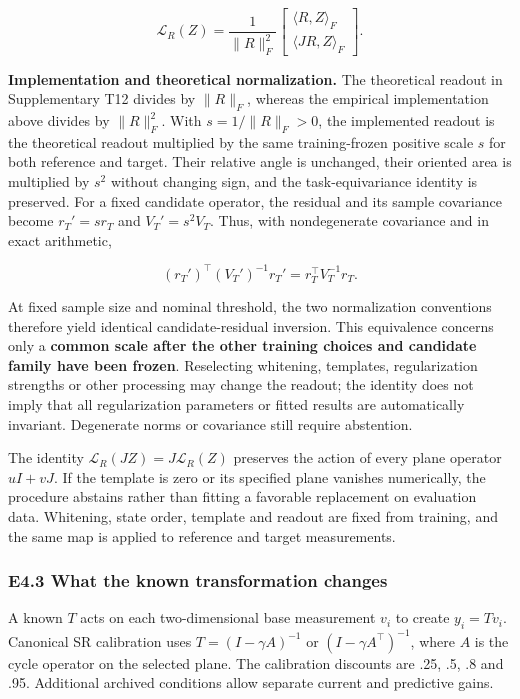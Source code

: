 \documentclass[11pt,a4paper]{article}
\begin{document}
\[
\mathcal L_R(Z)=\frac{1}{\|R\|_F^2}
\begin{bmatrix}\langle R,Z\rangle_F\\\langle JR,Z\rangle_F\end{bmatrix}.
\]

\textbf{Implementation and theoretical normalization.} The theoretical
readout in Supplementary T12 divides by \(\|R\|_F\), whereas the
empirical implementation above divides by \(\|R\|_F^2\). With
\(s=1/\|R\|_F>0\), the implemented readout is the theoretical readout
multiplied by the same training-frozen positive scale \(s\) for both
reference and target. Their relative angle is unchanged, their oriented
area is multiplied by \(s^2\) without changing sign, and the
task-equivariance identity is preserved. For a fixed candidate operator,
the residual and its sample covariance become \(r_T'=s r_T\) and
\(V_T'=s^2V_T\). Thus, with nondegenerate covariance and in exact
arithmetic,

\[
(r_T')^\top(V_T')^{-1}r_T'=r_T^\top V_T^{-1}r_T.
\]

At fixed sample size and nominal threshold, the two normalization
conventions therefore yield identical candidate-residual inversion. This
equivalence concerns only a \textbf{common scale after the other
training choices and candidate family have been frozen}. Reselecting
whitening, templates, regularization strengths or other processing may
change the readout; the identity does not imply that all regularization
parameters or fitted results are automatically invariant. Degenerate
norms or covariance still require abstention.

The identity \(\mathcal L_R(JZ)=J\mathcal L_R(Z)\) preserves the action
of every plane operator \(uI+vJ\). If the template is zero or its
specified plane vanishes numerically, the procedure abstains rather than
fitting a favorable replacement on evaluation data. Whitening, state
order, template and readout are fixed from training, and the same map is
applied to reference and target measurements.

\subsubsection{E4.3 What the known transformation
changes}\label{e4.3-what-the-known-transformation-changes}

A known \(T\) acts on each two-dimensional base measurement \(v_i\) to
create \(y_i=Tv_i\). Canonical SR calibration uses
\(T=(I-\gamma A)^{-1}\) or \((I-\gamma A^\top)^{-1}\), where \(A\) is
the cycle operator on the selected plane. The calibration discounts are
.25, .5, .8 and .95. Additional archived conditions allow separate
current and predictive gains.
\end{document}
